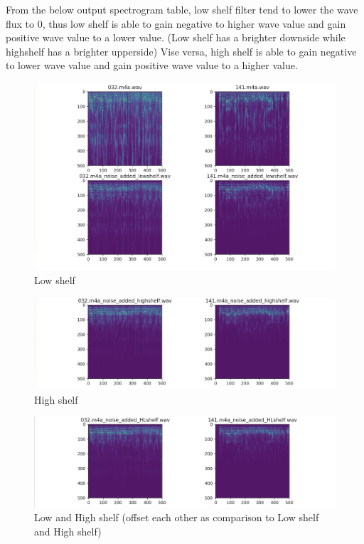 \documentclass[runningheads,a4paper]{llncs}
\begin{document}
From the below output spectrogram table, low shelf filter tend to lower the wave flux to 0, thus low shelf is able to gain negative to higher wave value and gain positive wave value to a lower value. (Low shelf has a brighter downside while highshelf has a brighter upperside) Vise versa, high shelf is able to gain negative to lower wave value and gain positive wave value to a higher value.\\

\begin{figure}[H]
\includegraphics[scale=0.25]{orig_low.jpeg}
\caption{Low shelf}
\label{fig:framework}
\end{figure}

\begin{figure}[H]
\includegraphics[scale=0.25]{high.jpeg}
\caption{High shelf}
\label{fig:framework}
\end{figure}

\begin{figure}[H]
\includegraphics[scale=0.25]{HL.jpeg}
\caption{Low and High shelf (offset each other as comparison to Low shelf and High shelf)}
\label{fig:framework}
\end{figure}
\end{document}
